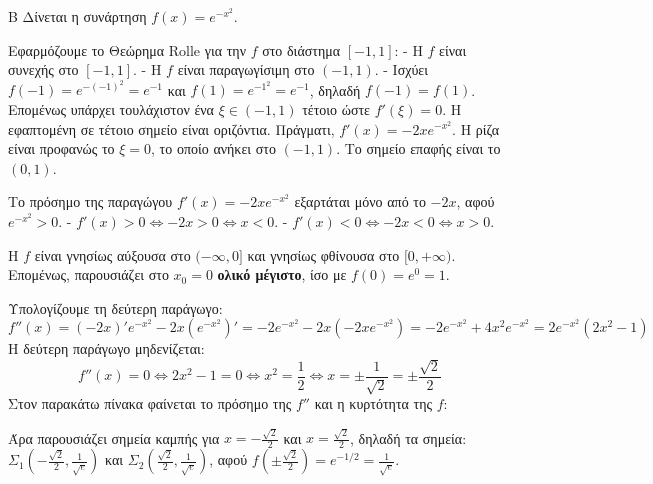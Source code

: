 \begin{thema}{Β}
Δίνεται η συνάρτηση $f(x) = e^{-x^2}$.
\begin{erwthma}
\item Εφαρμόζουμε το Θεώρημα Rolle για την $f$ στο διάστημα $[-1, 1]$:
- Η $f$ είναι συνεχής στο $[-1, 1]$.
- Η $f$ είναι παραγωγίσιμη στο $(-1, 1)$.
- Ισχύει $f(-1) = e^{-(-1)^2} = e^{-1}$ και $f(1) = e^{-1^2} = e^{-1}$, δηλαδή $f(-1) = f(1)$.
Επομένως υπάρχει τουλάχιστον ένα $\xi \in (-1, 1)$ τέτοιο ώστε $f'(\xi) = 0$. Η εφαπτομένη σε τέτοιο σημείο είναι οριζόντια.
Πράγματι, $f'(x) = -2x e^{-x^2}$. Η ρίζα είναι προφανώς το $\xi = 0$, το οποίο ανήκει στο $(-1, 1)$. Το σημείο επαφής είναι το $(0, 1)$.

\item Το πρόσημο της παραγώγου $f'(x) = -2x e^{-x^2}$ εξαρτάται μόνο από το $-2x$, αφού $e^{-x^2} > 0$.
- $f'(x) > 0 \Leftrightarrow -2x > 0 \Leftrightarrow x < 0$.
- $f'(x) < 0 \Leftrightarrow -2x < 0 \Leftrightarrow x > 0$.
\begin{center}
\end{center}
Η $f$ είναι γνησίως αύξουσα στο $(-\infty, 0]$ και γνησίως φθίνουσα στο $[0, +\infty)$.
Επομένως, παρουσιάζει στο $x_0 = 0$ \textbf{ολικό μέγιστο}, ίσο με $f(0) = e^0 = 1$.

\item Υπολογίζουμε τη δεύτερη παράγωγο:
\[ f''(x) = (-2x)' e^{-x^2} - 2x(e^{-x^2})' = -2 e^{-x^2} - 2x(-2x e^{-x^2}) = -2 e^{-x^2} + 4x^2 e^{-x^2} = 2e^{-x^2}(2x^2 - 1) \]
Η δεύτερη παράγωγο μηδενίζεται:
\[ f''(x) = 0 \Leftrightarrow 2x^2 - 1 = 0 \Leftrightarrow x^2 = \frac{1}{2} \Leftrightarrow x = \pm \frac{1}{\sqrt{2}} = \pm \frac{\sqrt{2}}{2} \]
Στον παρακάτω πίνακα φαίνεται το πρόσημο της $f''$ και η κυρτότητα της $f$:
\begin{center}
\end{center}
Άρα παρουσιάζει σημεία καμπής για $x = -\frac{\sqrt{2}}{2}$ και $x = \frac{\sqrt{2}}{2}$, δηλαδή τα σημεία:
$\Sigma_1\left(-\frac{\sqrt{2}}{2}, \frac{1}{\sqrt{e}}\right)$ και $\Sigma_2\left(\frac{\sqrt{2}}{2}, \frac{1}{\sqrt{e}}\right)$, αφού $f\left(\pm \frac{\sqrt{2}}{2} \right) = e^{-1/2} = \frac{1}{\sqrt{e}}$.


\end{erwthma}
\end{thema}
